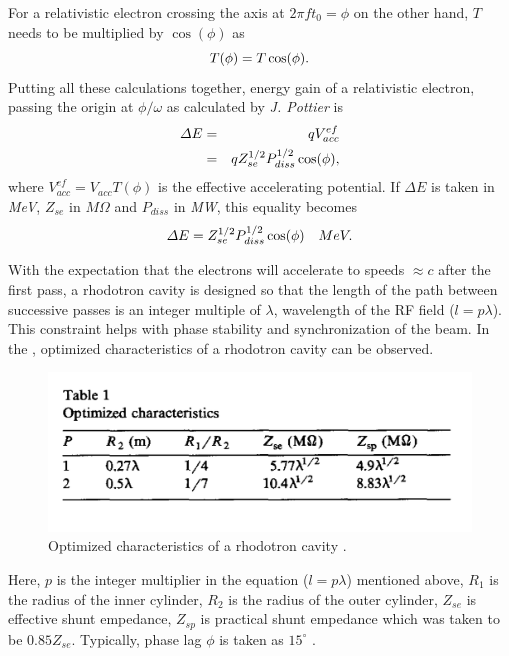 \documentclass[a4paper,oneside,12pt]{report}
\numberwithin{equation}{chapter}
\begin{document}
For a relativistic electron crossing the axis at $2\pi f t_0 = \phi$ on the other hand, $T$ needs to be multiplied by $\cos(\phi)$ as
\vspace{-10pt}\begin{equation}
    T(\phi) = T \cos(\phi) .
\vspace{-10pt}\end{equation} 
Putting all these calculations together, energy gain of a relativistic electron, passing the origin at $\phi / \omega$ as calculated by \textit{J. Pottier} is \cite{rhodo_pottier}
\vspace{-10pt}\begin{eqnarray}
    \Delta E &=& q V_{acc}^{ef} \nonumber\\
             &=& q Z_{se}^{1/2}P_{diss}^{1/2} \cos(\phi)  ,
\vspace{-20pt}\end{eqnarray}
where $ V_{acc}^{ef} = V_{acc} T(\phi)$ is the effective accelerating potential.
If $\Delta E$ is taken in \textit{MeV}, $Z_{se}$ in $M\Omega$ and $P_{diss}$ in \textit{MW}, this equality becomes
\vspace{-10pt}\begin{equation} \label{eq:W_gain_each_pass_pottier}
    \Delta E = Z_{se}^{1/2}P_{diss}^{1/2} \cos(\phi) \quad MeV .
\vspace{-10pt}\end{equation}


With the expectation that the electrons will accelerate to speeds $\approx c$ after the first pass, a rhodotron cavity is designed so that the length of the path between successive passes is an integer multiple of $\lambda$, wavelength of the RF field ($l=p\lambda \label{eq:lpl}$).
This constraint helps with  phase stability and synchronization of the beam.
In the , optimized characteristics of a rhodotron cavity can be observed. 
\begin{figure}[H]
    \centering
    \includegraphics[width=.9\textwidth]{./figures/pottier_table1.png}
    \caption{Optimized characteristics of a rhodotron cavity \cite{rhodo_pottier}.}
    \label{fig:pottier_table1}
\end{figure}
Here, $p$ is the integer multiplier in the equation ($l=p\lambda$) mentioned above, $R_1$ is the radius of the inner cylinder, $R_2$ is the radius of the outer cylinder, 
$Z_{se}$ is effective shunt empedance, $Z_{sp}$ is practical shunt empedance which was taken to be $0.85 Z_{se}$. Typically, phase lag $\phi$ is taken as $15^\circ$ \cite{rhodo_pottier}. 
\end{document}
